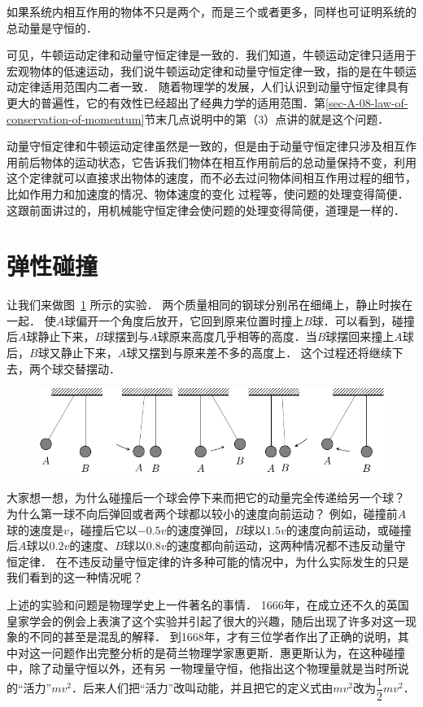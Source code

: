 如果系统内相互作用的物体不只是两个，而是三个或者更多，同样也可证明系统的总动量是守恒的．

可见，牛顿运动定律和动量守恒定律是一致的．我们知道，牛顿运动定律只适用于宏观物体的低速运动，我们说牛顿运动定律和动量守恒定律一致，指的是在牛顿运动定律适用范围内二者一致．
随着物理学的发展，人们认识到动量守恒定律具有更大的普遍性，它的有效性已经超出了经典力学的适用范围．第\ref{sec-A-08-law-of-conservation-of-momentum}节末几点说明中的第（3）点讲的就是这个问题．

动量守恒定律和牛顿运动定律虽然是一致的，但是由于动量守恒定律只涉及相互作用前后物体的运动状态，它告诉我们物体在相互作用前后的总动量保持不变，利用这个定律就可以直接求出物体的速度，而不必去过问物体间相互作用过程的细节，比如作用力和加速度的情况、物体速度的变化
过程等，使问题的处理变得简便．这跟前面讲过的，用机械能守恒定律会使问题的处理变得简便，道理是一样的．

\section{弹性碰撞}


让我们来做图~\ref{fig_A_8-7} 所示的实验．
两个质量相同的钢球分别吊在细绳上，静止时挨在一起．
使$A$球偏开一个角度后放开，它回到原来位置时撞上$B$球．可以看到，碰撞后$A$球静止下来，$B$球摆到与$A$球原来高度几乎相等的高度．当$B$球摆回来撞上$A$球后，$B$球又静止下来，$A$球又摆到与原来差不多的高度上．
这个过程还将继续下去，两个球交替摆动．


\begin{figure}[htbp]
	\centering
	\includegraphics{fig/A/8-7.pdf}
	\caption{}\label{fig_A_8-7}
\end{figure}

大家想一想，为什么碰撞后一个球会停下来而把它的动量完全传递给另一个球？
为什么第一球不向后弹回或者两个球都以较小的速度向前运动？
例如，碰撞前$A$球的速度是$v$，碰撞后它以$-0.5v$的速度弹回，$B$球以$1.5v$的速度向前运动，或碰撞后$A$球以$0.2v$的速度、$B$球以$0.8v$的速度都向前运动，这两种情况都不违反动量守恒定律．
在不违反动量守恒定律的许多种可能的情况中，为什么实际发生的只是我们看到的这一种情况呢？

上述的实验和问题是物理学史上一件著名的事情．
1666年，在成立还不久的英国皇家学会的例会上表演了这个实验并引起了很大的兴趣，随后出现了许多对这一现象的不同的甚至是混乱的解释．
到1668年，才有三位学者作出了正确的说明，其中对这一问题作出完整分析的是荷兰物理学家惠更斯．惠更斯认为，在这种碰撞中，除了动量守恒以外，还有另
一物理量守恒，他指出这个物理量就是当时所说的“活力”$mv^2$．后来人们把“活力”改叫动能，并且把它的定义式由$mv^2$改为$\dfrac{1}{2}mv^2$．

